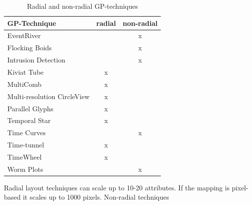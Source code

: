 \begin{table}[th]
	\centering
	\caption[Table 1]{Radial and non-radial GP-techniques}
	\label{radialTable}
	\begin{tabu}{lcc}
	\toprule
	GP-Technique & radial & non-radial \\
	\midrule
	EventRiver &  & x \\
	Flocking Boids &  & x \\
	Intrusion Detection &  & x \\
	Kiviat Tube & x &  \\
	MultiComb & x &  \\
	Multi-resolution CircleView & x &  \\
	Parallel Glyphs & x &  \\
    Temporal Star & x &  \\
	Time Curves &  & x \\
	Time-tunnel & x & \\
	TimeWheel & x & \\
	Worm Plots &  & x\\
	\bottomrule
	\end{tabu}
\end{table}

Radial layout techniques can scale up to 10-20 attributes. If the mapping is pixel-based it scales up to 1000 pixels\cite{Jayaraman2002}. 
Non-radial techniques

